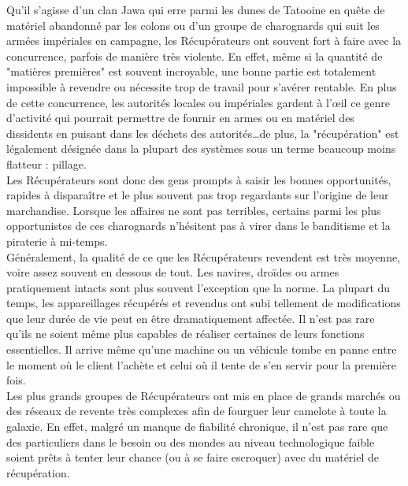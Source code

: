 \documentclass[twoside]{article}
\begin{document}
Qu'il s'agisse d'un clan Jawa qui erre parmi les dunes de Tatooine en quête de matériel abandonné par les colons ou d'un groupe de charognards qui suit les armées impériales en campagne, les Récupérateurs ont souvent fort à faire avec la concurrence, parfois de manière très violente. En effet, même si la quantité de "matières premières" est souvent incroyable, une bonne partie est totalement impossible à revendre ou nécessite trop de travail pour s'avérer rentable. En plus de cette concurrence, les autorités locales ou impériales gardent à l'œil ce genre d'activité qui pourrait permettre de fournir en armes ou en matériel des dissidents en puisant dans les déchets des autorités\ldots de plus, la "récupération" est légalement désignée dans la plupart des systèmes sous un terme beaucoup moins flatteur : pillage.\\

Les Récupérateurs sont donc des gens prompts à saisir les bonnes opportunités, rapides à dispara\^{i}tre et le plus souvent pas trop regardants sur l'origine de leur marchandise. Lorsque les affaires ne sont pas terribles, certains parmi les plus opportunistes de ces charognards n'hésitent pas à virer dans le banditisme et la piraterie à mi-temps.\\

Généralement, la qualité de ce que les Récupérateurs revendent est très moyenne, voire assez souvent en dessous de tout. Les navires, droïdes ou armes pratiquement intacts sont plus souvent l'exception que la norme. La plupart du temps, les appareillages récupérés et revendus ont subi tellement de modifications que leur durée de vie peut en être dramatiquement affectée. Il n'est pas rare qu'ils ne soient même plus capables de réaliser certaines de leurs fonctions essentielles. Il arrive même qu'une machine ou un véhicule tombe en panne entre le moment où le client l'achète et celui où il tente de s'en servir pour la première fois.\\

Les plus grands groupes de Récupérateurs ont mis en place de grands marchés ou des réseaux de revente très complexes afin de fourguer leur camelote à toute la galaxie. En effet, malgré un manque de fiabilité chronique, il n'est pas rare que des particuliers dans le besoin ou des mondes au niveau technologique faible soient prêts à tenter leur chance (ou à se faire escroquer) avec du matériel de récupération.\\
\end{document}
